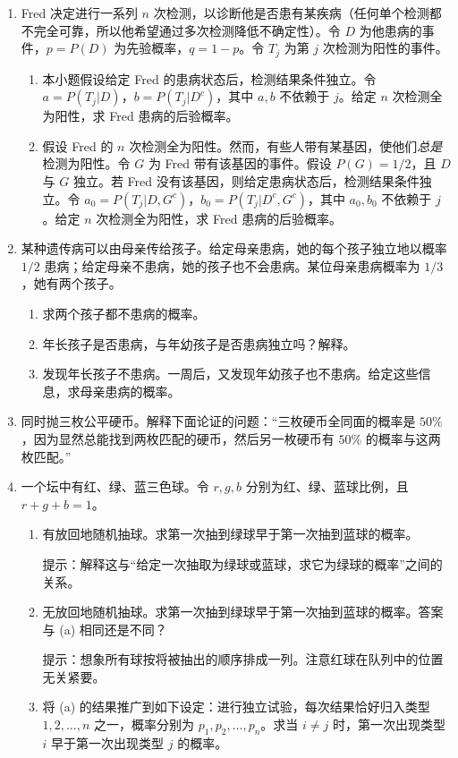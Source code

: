 \documentclass[UTF8, 12pt, fontset=fandol, oneside]{ctexart}
\begin{document}
\begin{enumerate}
  \item Fred 决定进行一系列 $n$ 次检测，以诊断他是否患有某疾病（任何单个检测都不完全可靠，所以他希望通过多次检测降低不确定性）。令 $D$ 为他患病的事件，$p=P(D)$ 为先验概率，$q=1-p$。令 $T_j$ 为第 $j$ 次检测为阳性的事件。
  \begin{enumerate}
    \item 本小题假设给定 Fred 的患病状态后，检测结果条件独立。令 $a=P(T_j|D)$，$b=P(T_j|D^c)$，其中 $a,b$ 不依赖于 $j$。给定 $n$ 次检测全为阳性，求 Fred 患病的后验概率。
    \item 假设 Fred 的 $n$ 次检测全为阳性。然而，有些人带有某基因，使他们\textit{总是}检测为阳性。令 $G$ 为 Fred 带有该基因的事件。假设 $P(G)=1/2$，且 $D$ 与 $G$ 独立。若 Fred 没有该基因，则给定患病状态后，检测结果条件独立。令 $a_0=P(T_j|D,G^c)$，$b_0=P(T_j|D^c,G^c)$，其中 $a_0,b_0$ 不依赖于 $j$。给定 $n$ 次检测全为阳性，求 Fred 患病的后验概率。
  \end{enumerate}

  \item 某种遗传病可以由母亲传给孩子。给定母亲患病，她的每个孩子独立地以概率 $1/2$ 患病；给定母亲不患病，她的孩子也不会患病。某位母亲患病概率为 $1/3$，她有两个孩子。
  \begin{enumerate}
    \item 求两个孩子都不患病的概率。
    \item 年长孩子是否患病，与年幼孩子是否患病独立吗？解释。
    \item 发现年长孩子不患病。一周后，又发现年幼孩子也不患病。给定这些信息，求母亲患病的概率。
  \end{enumerate}

  \item 同时抛三枚公平硬币。解释下面论证的问题：“三枚硬币全同面的概率是 $50\%$，因为显然总能找到两枚匹配的硬币，然后另一枚硬币有 $50\%$ 的概率与这两枚匹配。”

  \item 一个坛中有红、绿、蓝三色球。令 $r,g,b$ 分别为红、绿、蓝球比例，且 $r+g+b=1$。
  \begin{enumerate}
    \item 有放回地随机抽球。求第一次抽到绿球早于第一次抽到蓝球的概率。

    提示：解释这与“给定一次抽取为绿球或蓝球，求它为绿球的概率”之间的关系。
    \item 无放回地随机抽球。求第一次抽到绿球早于第一次抽到蓝球的概率。答案与 (a) 相同还是不同？

    提示：想象所有球按将被抽出的顺序排成一列。注意红球在队列中的位置无关紧要。
    \item 将 (a) 的结果推广到如下设定：进行独立试验，每次结果恰好归入类型 $1,2,\ldots,n$ 之一，概率分别为 $p_1,p_2,\ldots,p_n$。求当 $i\ne j$ 时，第一次出现类型 $i$ 早于第一次出现类型 $j$ 的概率。
  \end{enumerate}


\end{enumerate}
\end{document}
